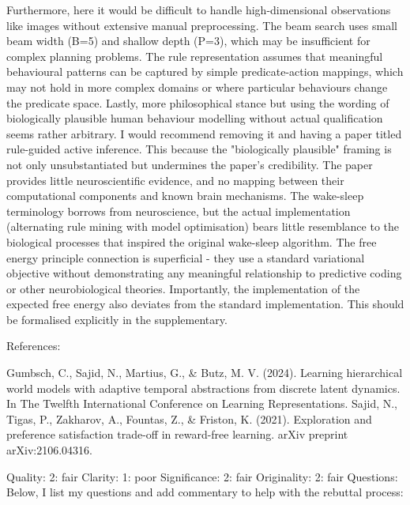 Furthermore, here it would be difficult to handle high-dimensional observations like images without extensive manual preprocessing. The beam search uses small beam width (B=5) and shallow depth (P=3), which may be insufficient for complex planning problems. The rule representation assumes that meaningful behavioural patterns can be captured by simple predicate-action mappings, which may not hold in more complex domains or where particular behaviours change the predicate space. Lastly, more philosophical stance but using the wording of biologically plausible human behaviour modelling without actual qualification seems rather arbitrary. I would recommend removing it and having a paper titled rule-guided active inference. This because the "biologically plausible" framing is not only unsubstantiated but undermines the paper's credibility. The paper provides little neuroscientific evidence, and no mapping between their computational components and known brain mechanisms. The wake-sleep terminology borrows from neuroscience, but the actual implementation (alternating rule mining with model optimisation) bears little resemblance to the biological processes that inspired the original wake-sleep algorithm. The free energy principle connection is superficial - they use a standard variational objective without demonstrating any meaningful relationship to predictive coding or other neurobiological theories. Importantly, the implementation of the expected free energy also deviates from the standard implementation. This should be formalised explicitly in the supplementary.

References:

Gumbsch, C., Sajid, N., Martius, G., & Butz, M. V. (2024). Learning hierarchical world models with adaptive temporal abstractions from discrete latent dynamics. In The Twelfth International Conference on Learning Representations. Sajid, N., Tigas, P., Zakharov, A., Fountas, Z., & Friston, K. (2021). Exploration and preference satisfaction trade-off in reward-free learning. arXiv preprint arXiv:2106.04316.

Quality: 2: fair
Clarity: 1: poor
Significance: 2: fair
Originality: 2: fair
Questions:
Below, I list my questions and add commentary to help with the rebuttal process:

